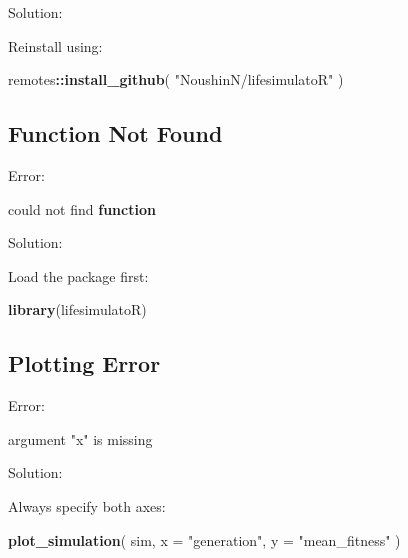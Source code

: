 \documentclass[
  oneside,
  openany]{book}
\newenvironment{Shaded}{\begin{snugshade}}{\end{snugshade}}
\newcommand{\AttributeTok}[1]{\textcolor[rgb]{0.13,0.29,0.53}{#1}}
\newcommand{\ControlFlowTok}[1]{\textcolor[rgb]{0.13,0.29,0.53}{\textbf{#1}}}
\newcommand{\FunctionTok}[1]{\textcolor[rgb]{0.13,0.29,0.53}{\textbf{#1}}}
\newcommand{\NormalTok}[1]{#1}
\newcommand{\SpecialCharTok}[1]{\textcolor[rgb]{0.81,0.36,0.00}{\textbf{#1}}}
\newcommand{\StringTok}[1]{\textcolor[rgb]{0.31,0.60,0.02}{#1}}
\begin{document}
Solution:

Reinstall using:

\begin{Shaded}
\begin{Highlighting}[]
\NormalTok{remotes}\SpecialCharTok{::}\FunctionTok{install\_github}\NormalTok{(}
  \StringTok{"NoushinN/lifesimulatoR"}
\NormalTok{)}
\end{Highlighting}
\end{Shaded}

\subsection{Function Not Found}\label{function-not-found}

Error:

\begin{Shaded}
\begin{Highlighting}[]
\NormalTok{could not find }\ControlFlowTok{function}
\end{Highlighting}
\end{Shaded}

Solution:

Load the package first:

\begin{Shaded}
\begin{Highlighting}[]
\FunctionTok{library}\NormalTok{(lifesimulatoR)}
\end{Highlighting}
\end{Shaded}

\subsection{Plotting Error}\label{plotting-error}

Error:

\begin{Shaded}
\begin{Highlighting}[]
\NormalTok{argument }\StringTok{"x"}\NormalTok{ is missing}
\end{Highlighting}
\end{Shaded}

Solution:

Always specify both axes:

\begin{Shaded}
\begin{Highlighting}[]
\FunctionTok{plot\_simulation}\NormalTok{(}
\NormalTok{  sim,}
  \AttributeTok{x =} \StringTok{"generation"}\NormalTok{,}
  \AttributeTok{y =} \StringTok{"mean\_fitness"}
\NormalTok{)}
\end{Highlighting}
\end{Shaded}
\end{document}
